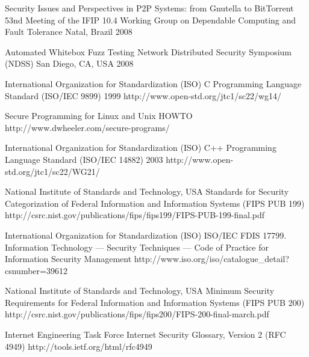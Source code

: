 \begin{thebibliography}{9}
		{}
		{Security Issues and Perspectives in P2P Systems: from Gnutella to BitTorrent}
		{53nd Meeting of the IFIP 10.4 Working Group on Dependable Computing and Fault Tolerance}
		{Natal, Brazil}
		{2008}
	
		{
			\biband
			\biband
			}
		{Automated Whitebox Fuzz Testing}
		{Network Distributed Security Symposium ({NDSS})}
		{San Diego, CA, USA}
		{2008}


		{International Organization for Standardization (ISO)}
		{{C} Programming Language Standard ({ISO/IEC} 9899)}
		{1999}
		{http://www.open-std.org/jtc1/sc22/wg14/}
		
		{}
		{Secure Programming for {L}inux and {U}nix {HOWTO}}
		{}
		{http://www.dwheeler.com/secure-programs/}
		
		{International Organization for Standardization (ISO)}
		{{C++} Programming Language Standard ({ISO/IEC} 14882)}
		{2003}
		{http://www.open-std.org/jtc1/sc22/WG21/}
		
		{National Institute of Standards and Technology, USA}
		{Standards for Security Categorization of Federal Information and Information Systems ({FIPS PUB} 199)}
		{}
		{http://csrc.nist.gov/publications/fips/fips199/FIPS-PUB-199-final.pdf}
		
		{International Organization for Standardization (ISO)}
		{ISO/IEC FDIS 17799. Information Technology — Security Techniques — Code of Practice for Information Security Management}
		{}
		{http://www.iso.org/iso/catalogue_detail?csnumber=39612}
	
		{National Institute of Standards and Technology, USA}
		{Minimum Security Requirements for Federal Information and Information Systems ({FIPS PUB} 200)}
		{}
		{http://csrc.nist.gov/publications/fips/fips200/FIPS-200-final-march.pdf}
	
		{Internet Engineering Task Force}
		{Internet Security Glossary, Version 2 ({RFC} 4949)}
		{}
		{http://tools.ietf.org/html/rfc4949}
		

\end{thebibliography}
